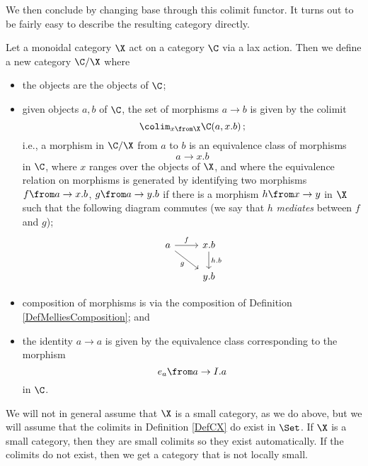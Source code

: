 We then conclude by changing base through this colimit functor.  
It turns out to be fairly easy to describe the resulting category directly.

\begin{definition}
  Let a monoidal category $\X$ act on a category $\C$ via a lax action.  
  Then we define a new category $\C/\X$ where
  \begin{itemize}
    \item the objects are the objects of $\C$;
    \item given objects $a,b$ of $\C$, the set of morphisms $a \to b$ is given by the colimit
      \[
        \colim_{x\from \X} \C(a,x.b)\,;
        \]
      i.e., a morphism in $\C/\X$ from $a$ to $b$ is an equivalence class of \Mellies morphisms
      \[
        a \to x.b
        \]
      in $\C$, where $x$ ranges over the objects of $\X$, and where the equivalence relation on morphisms is generated by identifying two morphisms $f\from a \to x.b$, $g \from a \to y.b$ if there is a morphism $h\from x\to y$ in $\X$ such that the following diagram commutes (we say that $h$ \emph{mediates} between $f$ and $g$);
      \[
        \begin{tikzcd}
          a \arrow[r, "f"] \arrow[dr, "g"']
            & x.b \arrow[d, "h.b"] \\
            & y.b
        \end{tikzcd}
        \]
    \item composition of morphisms is via the \Mellies composition of Definition \ref{DefMelliesComposition}; and
    \item the identity $a\to a$ is given by the equivalence class corresponding to the morphism
      \[
        e_a \from a \to I.a
        \]
      in $\C$.
  \end{itemize}
  \label{DefCX}
\end{definition}

\begin{remark}
  We will not in general assume that $\X$ is a small category, as we do above, but we will assume that the colimits in Definition \ref{DefCX} do exist in $\Set$.  
  If $\X$ is a small category, then they are small colimits so they exist automatically.
  If the colimits do not exist, then we get a category that is not locally small.
\end{remark}

